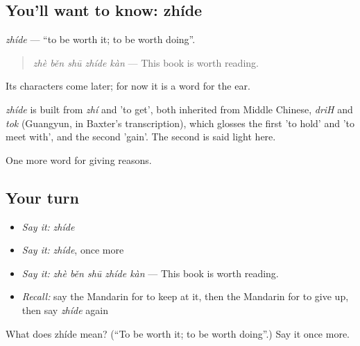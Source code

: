 \subsection*{You'll want to know: zhíde}
\emph{zhíde} — \textquotedblleft{}to be worth it; to be worth doing\textquotedblright{}.

\begin{quote}
\emph{zhè běn shū zhíde kàn} — This book is worth reading.
\end{quote}

Its characters come later; for now it is a word for the ear.

\begin{cousinweb}
\emph{zhíde} is built from \emph{zhí} and  'to get', both inherited from Middle Chinese, \emph{driH} and \emph{tok} (Guangyun, in Baxter's transcription), which glosses the first 'to hold' and 'to meet with', and the second 'gain'. The second is said light here.
\end{cousinweb}

\begin{grammarlens}[title={What you've built}]
One more word for giving reasons.
\end{grammarlens}

\subsection*{Your turn}
\begin{itemize}
\raggedright
  \item \emph{Say it:} \emph{zhíde}
  \item \emph{Say it:} \emph{zhíde}, once more
  \item \emph{Say it:} \emph{zhè běn shū zhíde kàn} — This book is worth reading.
  \item \emph{Recall:} say the Mandarin for to keep at it, then the Mandarin for to give up, then say \emph{zhíde} again
\end{itemize}

\begin{tcolorbox}[breakable,colback=teal!4,colframe=teal!35!black,title={Before you move on}]
What does zhíde mean? (\textquotedblleft{}To be worth it; to be worth doing\textquotedblright{}.) Say it once more.
\end{tcolorbox}
